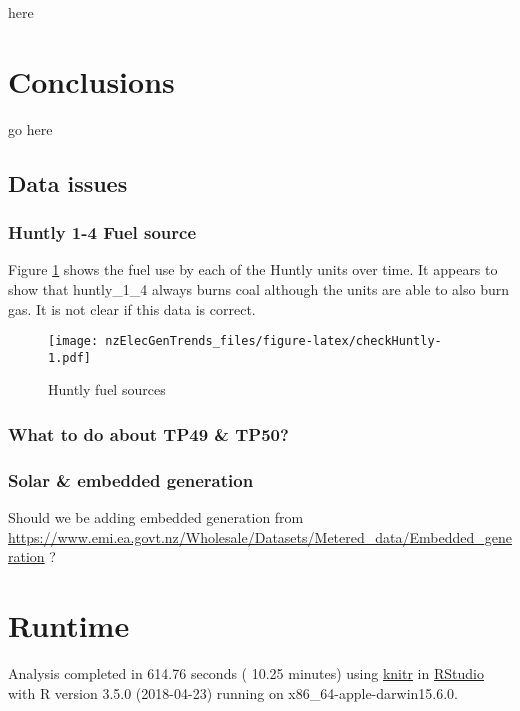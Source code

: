 \documentclass[]{article}
\theoremstyle{definition}
\theoremstyle{definition}
\theoremstyle{definition}
\theoremstyle{remark}
\begin{document}
here

\section{Conclusions}\label{conclusions}

go here

\subsection{Data issues}\label{data-issues}

\subsubsection{Huntly 1-4 Fuel source}\label{huntly-1-4-fuel-source}

Figure \ref{fig:checkHuntly} shows the fuel use by each of the Huntly
units over time. It appears to show that huntly\_1\_4 always burns coal
although the units are able to also burn gas. It is not clear if this
data is correct.

\begin{figure}
\centering
\texttt{[image: nzElecGenTrends\_files/figure-latex/checkHuntly-1.pdf]}
\caption{\label{fig:checkHuntly}Huntly fuel sources}
\end{figure}

\subsubsection{What to do about TP49 \&
TP50?}\label{what-to-do-about-tp49-tp50}

\subsubsection{Solar \& embedded
generation}\label{solar-embedded-generation}

Should we be adding embedded generation from
\url{https://www.emi.ea.govt.nz/Wholesale/Datasets/Metered_data/Embedded_generation}
?

\section{Runtime}\label{runtime}

Analysis completed in 614.76 seconds ( 10.25 minutes) using
\href{https://cran.r-project.org/package=knitr}{knitr} in
\href{http://www.rstudio.com}{RStudio} with R version 3.5.0 (2018-04-23)
running on x86\_64-apple-darwin15.6.0.
\end{document}
